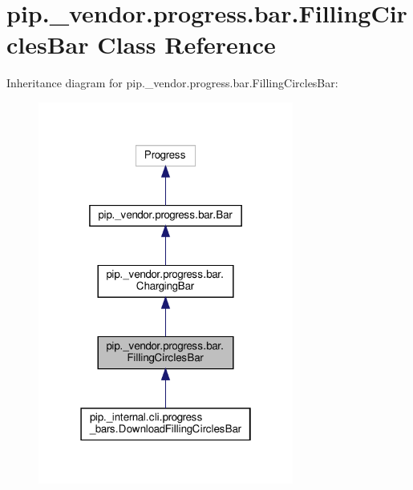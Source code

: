 \hypertarget{classpip_1_1__vendor_1_1progress_1_1bar_1_1FillingCirclesBar}{}\section{pip.\+\_\+vendor.\+progress.\+bar.\+Filling\+Circles\+Bar Class Reference}
\label{classpip_1_1__vendor_1_1progress_1_1bar_1_1FillingCirclesBar}


Inheritance diagram for pip.\+\_\+vendor.\+progress.\+bar.\+Filling\+Circles\+Bar\+:
\nopagebreak
\begin{figure}[H]
\begin{center}
\leavevmode
\includegraphics[width=238pt]{classpip_1_1__vendor_1_1progress_1_1bar_1_1FillingCirclesBar__inherit__graph}
\end{center}
\end{figure}


